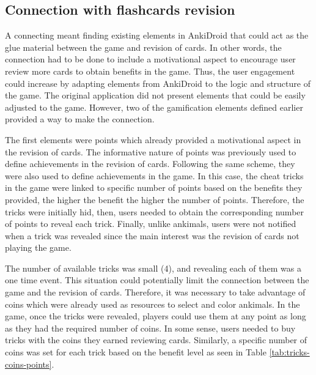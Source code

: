 \subsection{Connection with flashcards revision}
A connecting meant finding existing elements in AnkiDroid that could act as the glue material between the game and revision of cards. In other words, the connection had to be done to include a motivational aspect to encourage user review more cards to obtain benefits in the game. Thus, the user engagement could increase by adapting elements from AnkiDroid to the logic and structure of the game. The original application did not present elements that could be easily adjusted to the game. However, two of the gamification elements defined earlier provided a way to make the connection.

The first elements were points which already provided a motivational aspect in the revision of cards. The informative nature of points was previously used to define achievements in the revision of cards. Following the same scheme, they were also used to define achievements in the game. In this case, the cheat tricks in the game were linked to specific number of points based on the benefits they provided, the higher the benefit the higher the number of points. Therefore, the tricks were initially hid, then, users needed to obtain the corresponding number of points to reveal each trick. Finally, unlike ankimals, users were not notified when a trick was revealed since the main interest was the revision of cards not playing the game.

The number of available tricks was small (4), and revealing each of them was a one time event. This situation could potentially limit the connection between the game and the revision of cards. Therefore, it was necessary to take advantage of coins which were already used as resources to select and color ankimals. In the game, once the tricks were revealed, players could use them at any point as long as they had the required number of coins. In some sense, users needed to buy tricks with the coins they earned reviewing cards. Similarly, a specific number of coins was set for each trick based on the benefit level as seen in Table \ref{tab:tricks-coins-points}.

